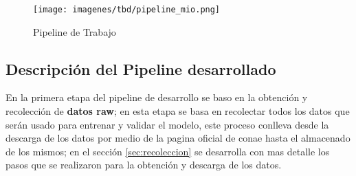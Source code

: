 \begin{figure}[H] \centering
  \texttt{[image: imagenes/tbd/pipeline\_mio.png]}
  \caption{Pipeline de Trabajo}\label{Fig:pipeline-mio}
\end{figure}

\subsection{Descripción del Pipeline desarrollado}\label{sub:desc-pipeline}

En la primera etapa del pipeline de desarrollo se baso en la obtención y recolección de \textbf{datos raw}; en esta etapa se basa en recolectar todos los datos que serán usado para entrenar y validar el modelo, este proceso conlleva desde la descarga de los datos por medio de la pagina oficial de \ac{conae} hasta el almacenado de los mismos; en el sección \ref{sec:recoleccion} se desarrolla con mas detalle los pasos que se realizaron para la obtención y descarga de los datos.



